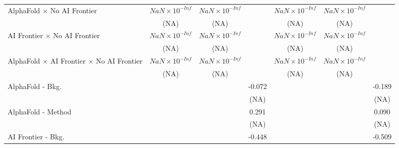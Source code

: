 \begin{tabular}{lcccccc}
   AlphaFold $\times$ No AI Frontier                                          & $NaN\times 10^{-Inf}$  & $NaN\times 10^{-Inf}$  &                        & $NaN\times 10^{-Inf}$  & $NaN\times 10^{-Inf}$  &   \\   
                                                                              & (NA)                   & (NA)                   &                        & (NA)                   & (NA)                   &   \\   
   AI Frontier $\times$ No AI Frontier                                        & $NaN\times 10^{-Inf}$  & $NaN\times 10^{-Inf}$  &                        & $NaN\times 10^{-Inf}$  & $NaN\times 10^{-Inf}$  &   \\   
                                                                              & (NA)                   & (NA)                   &                        & (NA)                   & (NA)                   &   \\   
   AlphaFold $\times$ AI Frontier $\times$ No AI Frontier                     & $NaN\times 10^{-Inf}$  & $NaN\times 10^{-Inf}$  &                        & $NaN\times 10^{-Inf}$  & $NaN\times 10^{-Inf}$  &   \\   
                                                                              & (NA)                   & (NA)                   &                        & (NA)                   & (NA)                   &   \\   
   AlphaFold - Bkg.                                                           &                        &                        & -0.072                 &                        &                        & -0.189\\   
                                                                              &                        &                        & (NA)                   &                        &                        & (NA)\\   
   AlphaFold - Method                                                         &                        &                        & 0.291                  &                        &                        & 0.090\\   
                                                                              &                        &                        & (NA)                   &                        &                        & (NA)\\   
   AI Frontier - Bkg.                                                         &                        &                        & -0.448                 &                        &                        & -0.509\\   

\end{tabular}
